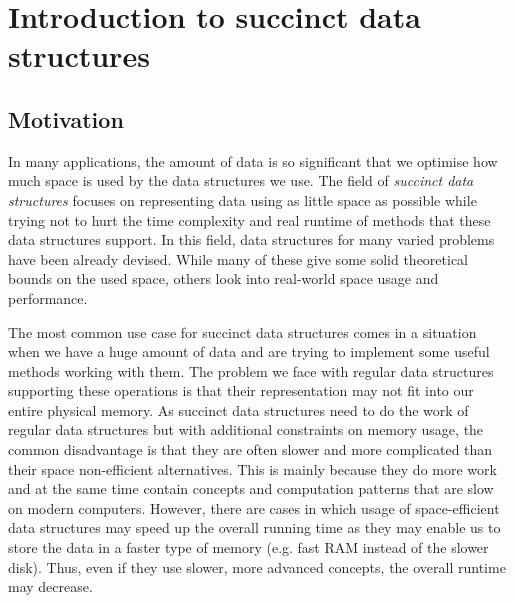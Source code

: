 \chapter{Introduction to succinct data structures}
\label{kap:kap1}

\section{Motivation}

In many applications, the amount of data is so significant that we optimise how much
space is used by the data structures we use. The field of \textit{succinct data structures}
focuses on representing data using as little space as possible while trying not to hurt
the time complexity and real runtime of methods that these data structures support. In
this field, data structures for many varied problems have been already devised. While
many of these give some solid theoretical bounds on the used space, others look into
real-world space usage and performance.

The most common use case for succinct data structures comes in a situation when we
have a huge amount of data and are trying to implement some useful methods working
with them. The problem we face with regular data structures supporting these
operations is that their representation may not fit into our entire physical
memory. As succinct data structures need to do the work of regular data structures but
with additional constraints on memory usage, the common disadvantage is that
they are often slower and more complicated than their space non-efficient
alternatives. This is mainly because they do more work and at the same time contain
concepts and computation patterns that are slow on modern computers. However, there
are cases in which usage of space-efficient data structures may speed up the overall
running time as they may enable us to store the data in a faster type of memory
(e.g. fast RAM instead of the slower disk). Thus, even if they use slower, more
advanced concepts, the overall runtime may decrease.


